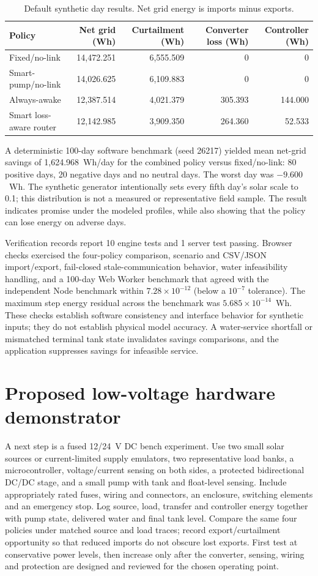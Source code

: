 \documentclass[11pt]{article}
\begin{document}
\begin{table}[ht]
\centering
\small
\setlength{\tabcolsep}{4pt}
\caption{Default synthetic day results. Net grid energy is imports minus exports.}
\begin{tabular}{lrrrr}
\toprule
Policy & Net grid (Wh) & Curtailment (Wh) & Converter loss (Wh) & Controller (Wh)\\
\midrule
Fixed/no-link & 14,472.251 & 6,555.509 & 0 & 0\\
Smart-pump/no-link & 14,026.625 & 6,109.883 & 0 & 0\\
Always-awake & 12,387.514 & 4,021.379 & 305.393 & 144.000\\
Smart loss-aware router & 12,142.985 & 3,909.350 & 264.360 & 52.533\\
\bottomrule
\end{tabular}
\end{table}

A deterministic 100-day software benchmark (seed 26217) yielded mean net-grid savings of 1,624.968~Wh/day for the combined policy versus fixed/no-link: 80 positive days, 20 negative days and no neutral days. The worst day was $-9.600$~Wh. The synthetic generator intentionally sets every fifth day's solar scale to 0.1; this distribution is not a measured or representative field sample. The result indicates promise under the modeled profiles, while also showing that the policy can lose energy on adverse days.

Verification records report 10 engine tests and 1 server test passing. Browser checks exercised the four-policy comparison, scenario and CSV/JSON import/export, fail-closed stale-communication behavior, water infeasibility handling, and a 100-day Web Worker benchmark that agreed with the independent Node benchmark within $7.28\times10^{-12}$ (below a $10^{-7}$ tolerance). The maximum step energy residual across the benchmark was $5.685\times10^{-14}$~Wh. These checks establish software consistency and interface behavior for synthetic inputs; they do not establish physical model accuracy. A water-service shortfall or mismatched terminal tank state invalidates savings comparisons, and the application suppresses savings for infeasible service.

\section{Proposed low-voltage hardware demonstrator}
A next step is a fused 12/24~V DC bench experiment. Use two small solar sources or current-limited supply emulators, two representative load banks, a microcontroller, voltage/current sensing on both sides, a protected bidirectional DC/DC stage, and a small pump with tank and float-level sensing. Include appropriately rated fuses, wiring and connectors, an enclosure, switching elements and an emergency stop. Log source, load, transfer and controller energy together with pump state, delivered water and final tank level. Compare the same four policies under matched source and load traces; record export/curtailment opportunity so that reduced imports do not obscure lost exports. First test at conservative power levels, then increase only after the converter, sensing, wiring and protection are designed and reviewed for the chosen operating point.
\end{document}
